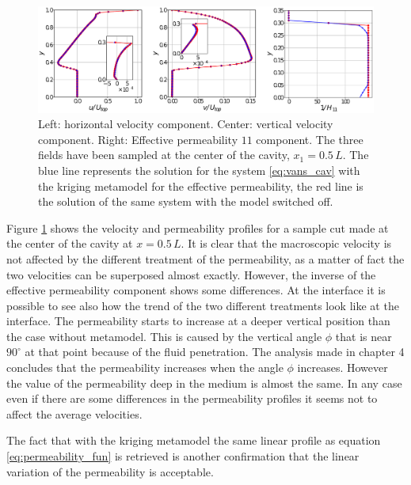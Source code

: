 \begin{figure}[h]
	\centering
	\includegraphics[width=0.9\linewidth]{chapter_5/figure/cav_5000}
	\caption{Left: horizontal velocity component. Center: vertical velocity component. Right: Effective permeability $11$ component. The three fields have been sampled at the center of the cavity, $x_1=0.5 \,L$. The blue line represents the solution for the system \eqref{eq:vans_cav} with the kriging metamodel for the effective permeability, the red line is the solution of the same system with the model switched off.}
	\label{fig:cav5000}
\end{figure}

Figure \ref{fig:cav5000} shows the velocity and permeability profiles for a sample cut made at the center of the cavity at $x=0.5\,L$.
It is clear that the macroscopic velocity is not affected by the different treatment of the permeability, as a matter of fact the two velocities can be superposed almost exactly.
However, the inverse of the effective permeability component shows some differences. At the interface it is possible to see also how the trend of the two different treatments look like at the interface. The permeability starts to increase at a deeper vertical position than the case without metamodel. This is caused by the vertical angle $\phi$ that is near $90^\circ$ at that point because of the fluid penetration. The analysis made in chapter 4 concludes that the permeability increases when the angle $\phi$ increases.
However the value of the permeability deep in the medium is almost the same. 
In any case even if there are some differences in the permeability profiles it seems not to affect the average velocities.

The fact that with the kriging metamodel the same linear profile as equation \eqref{eq:permeability_fun} is retrieved is another confirmation that the linear variation of the permeability is acceptable.


